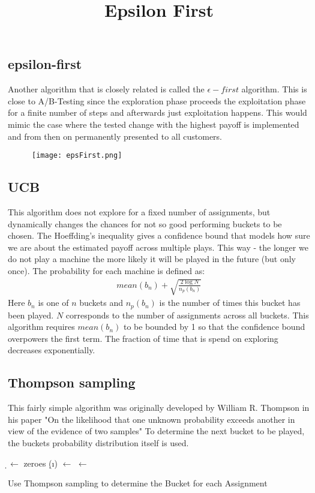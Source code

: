 \documentclass[main.tex]{subfiles}
\begin{document}
\subsection{epsilon-first}
Another algorithm that is closely related is called the $\epsilon-first$ algorithm. This is close to A/B-Testing since the exploration phase proceeds the exploitation phase for a finite number of steps and afterwards just exploitation happens. This would mimic the case where the tested change with the highest payoff is implemented and from then on permanently presented to all customers.
\begin{figure}[ht]
\texttt{[image: epsFirst.png]}
\centering
\title{Epsilon First}
\end{figure}

\subsection{UCB}
This algorithm does not explore for a fixed number of assignments, but dynamically changes the chances for not so good performing buckets to be chosen. The Hoeffding's inequality gives a confidence bound that models how sure we are about the estimated payoff across multiple plays. This way - the longer we do not play a machine the more likely it will be played in the future (but only once). The probability for each machine is defined as:
\begin{align*}
mean(b_n) + \sqrt{\frac{2\log{N}}{n_p(b_n)}}
\end{align*}
Here $b_n$ is one of $n$ buckets and $n_p(b_n)$ is the number of times this bucket has been played. $N$ corresponds to the number of assignments across all buckets. This algorithm requires $mean(b_n)$ to be bounded by 1 so that the confidence bound overpowers the first term. The fraction of time that is spend on exploring decreases exponentially.
\

\subsection{Thompson sampling}
This fairly simple algorithm was originally developed by William R. Thompson in his paper "On the likelihood that one unknown probability exceeds another in view of the evidence of two samples" \cite{thompson1933likelihood} To determine the next bucket to be played, the buckets probability distribution itself is used.
\begin{algorithm}
\KwIn{\b}
\KwOut{\na}
\BlankLine
\d $\leftarrow$ zeroes \;
{
\d(\i) $\leftarrow$ \draw{\b{\i}}
}
\na $\leftarrow$ \max{\d} \;

\caption[Thompson Sampling]{Use Thompson sampling to determine the Bucket for each Assignment}
\label{alg:ThompsonSampling}
\end{algorithm}
\end{document}
